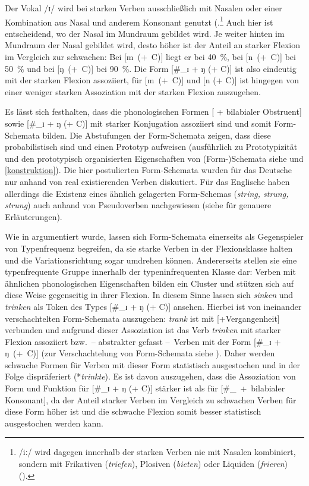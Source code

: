  

Der Vokal /ɪ/ wird bei starken Verben ausschließlich mit Nasalen oder einer Kombination aus Nasal und anderem Konsonant genutzt (\textcite[55]{Kopcke.1999}.\footnote{/iː/ wird dagegen innerhalb der starken Verben nie mit Nasalen kombiniert, sondern mit Frikativen (\textit{\textit{triefen}}), Plosiven (\textit{bieten}) oder Liquiden (\textit{frieren}) (\cite[55]{Kopcke.1999}).}  Auch hier ist entscheidend, wo der Nasal im Mundraum gebildet wird. Je weiter hinten im Mundraum der Nasal gebildet wird, desto höher ist der Anteil an starker Flexion im Vergleich zur schwachen: Bei [m~(+~C)] liegt er bei 40~\%, bei [n~(+~C)] bei 50~\% und bei [ŋ~(+~C)] bei 90~\%. Die Form [\#\_ɪ + ŋ (+ C)] ist also eindeutig mit der starken Flexion assoziiert, für [m~(+~C)] und [n (+ C)] ist hingegen von einer weniger starken Assoziation mit der starken Flexion auszugehen. 



Es lässt sich festhalten, dass die phonologischen Formen [{} + bilabialer Ob\-stru\-ent] sowie [\#\_ɪ + ŋ (+ C)] mit starker Konjugation assoziiert sind und somit Form-Schemata bilden. Die Abstufungen der Form-Schemata zeigen, dass diese probabilistisch sind und einen Prototyp aufweisen (ausführlich zu Prototypizität und den prototypisch organisierten Eigenschaften von (Form-)Schemata siehe  und \ref{konstruktion}). Die hier postulierten Form-Schemata wurden für das Deutsche nur anhand von real existierenden Verben diskutiert. Für das Englische haben \textcite{Bybee.1983} allerdings die Existenz eines ähnlich gelagerten Form-Schemas (\textit{string, strung, strung}) auch anhand von Pseudoverben nachgewiesen (siehe  für genauere Erläuterungen).

Wie in  argumentiert wurde, lassen sich Form-Schemata einerseits als Gegenspieler von Typenfrequenz begreifen, da sie starke Verben in der Flexionsklasse halten und die Variationsrichtung sogar umdrehen können. Andererseits stellen sie eine typenfrequente Gruppe innerhalb der typeninfrequenten Klasse dar: Verben mit ähnlichen phonologischen Eigenschaften bilden ein Cluster und stützen sich auf diese Weise gegenseitig in ihrer Flexion. In diesem Sinne lassen sich \textit{sinken} und \textit{trinken} als Token des Types [\#\_ɪ + ŋ (+ C)] ansehen. Hierbei ist von ineinander verschachtelten Form-Schemata auszugehen: \textit{trank} ist mit [+Vergangenheit] verbunden und aufgrund dieser Assoziation ist das Verb \textit{trinken} mit starker Flexion assoziiert bzw.~-- abstrakter gefasst --~Verben mit der Form [\#\_ɪ + ŋ~(+~C)] (zur Verschachtelung von Form-Schemata siehe ). Daher werden schwache Formen für Verben mit dieser Form statistisch ausgestochen und in der Folge dispräferiert (*\textit{trinkte}). Es ist davon auszugehen, dass die Assoziation von Form und Funktion für [\#\_ɪ + ŋ (+ C)]  stärker ist als für [\#\_{}~+~bilabialer Konsonant], da der Anteil starker Verben im Vergleich zu schwachen Verben für diese Form höher ist und  die schwache Flexion somit besser statistisch ausgestochen werden kann.



